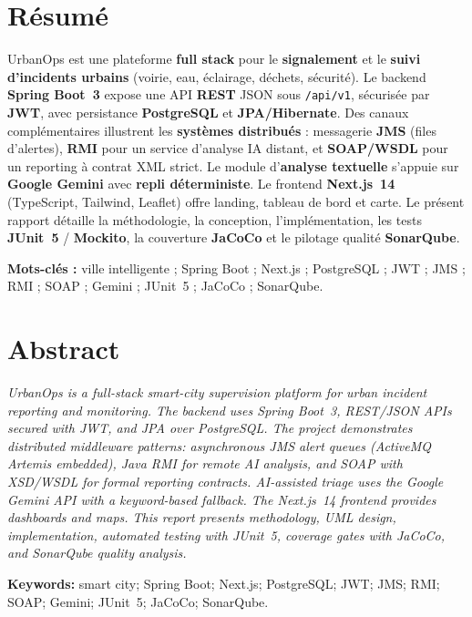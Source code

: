 \documentclass[12pt,a4paper,twoside,openany]{book}
\begin{document}
\chapter*{R\'esum\'e}
\thispagestyle{plain}
\begin{resumebox}
\justifying
UrbanOps est une plateforme \textbf{full stack} pour le \textbf{signalement} et le \textbf{suivi d'incidents urbains} (voirie, eau, éclairage, déchets, sécurité). Le backend \textbf{Spring Boot~3} expose une API \textbf{REST} JSON sous \texttt{/api/v1}, sécurisée par \textbf{JWT}, avec persistance \textbf{PostgreSQL} et \textbf{JPA/Hibernate}. Des canaux complémentaires illustrent les \textbf{systèmes distribués} : messagerie \textbf{JMS} (files d'alertes), \textbf{RMI} pour un service d'analyse IA distant, et \textbf{SOAP/WSDL} pour un reporting à contrat XML strict. Le module d'\textbf{analyse textuelle} s'appuie sur \textbf{Google Gemini} avec \textbf{repli déterministe}. Le frontend \textbf{Next.js~14} (TypeScript, Tailwind, Leaflet) offre landing, tableau de bord et carte. Le présent rapport détaille la méthodologie, la conception, l'implémentation, les tests \textbf{JUnit~5} / \textbf{Mockito}, la couverture \textbf{JaCoCo} et le pilotage qualité \textbf{SonarQube}.
\end{resumebox}
\vspace{0.75cm}
\begin{center}
\textbf{Mots-cl\'es :} ville intelligente ; Spring Boot ; Next.js ; PostgreSQL ; JWT ; JMS ; RMI ; SOAP ; Gemini ; JUnit~5 ; JaCoCo ; SonarQube.
\end{center}
\clearpage

\chapter*{Abstract}
\thispagestyle{plain}
\begin{center}
\begin{minipage}{0.88\textwidth}
\justifying
\textit{UrbanOps is a full-stack smart-city supervision platform for urban incident reporting and monitoring. The backend uses Spring Boot~3, REST/JSON APIs secured with JWT, and JPA over PostgreSQL. The project demonstrates distributed middleware patterns: asynchronous JMS alert queues (ActiveMQ Artemis embedded), Java RMI for remote AI analysis, and SOAP with XSD/WSDL for formal reporting contracts. AI-assisted triage uses the Google Gemini API with a keyword-based fallback. The Next.js~14 frontend provides dashboards and maps. This report presents methodology, UML design, implementation, automated testing with JUnit~5, coverage gates with JaCoCo, and SonarQube quality analysis.}
\end{minipage}
\end{center}
\vspace{0.75cm}
\begin{center}
\textbf{Keywords:} smart city; Spring Boot; Next.js; PostgreSQL; JWT; JMS; RMI; SOAP; Gemini; JUnit~5; JaCoCo; SonarQube.
\end{center}
\clearpage
\end{document}
